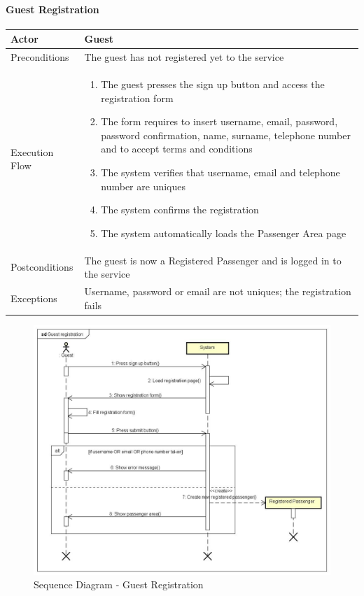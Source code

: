 		\paragraph{Guest Registration}
			\begin{center}
				\begin{tabular}{ | l | p{8cm} |}
					\hline
					Actor &  Guest	\\ \hline
					Preconditions & The guest has not registered yet to the service		\\ \hline
					Execution Flow & \begin{enumerate}
						\item The guest presses the sign up button and access the registration form
						\item The form requires to insert username, email, password, password confirmation, name, surname, telephone number and to accept terms and conditions
						\item The system verifies that username, email and telephone number are uniques
						\item The system confirms the registration
						\item The system automatically loads the Passenger Area page
					\end{enumerate}		\\ \hline
					Postconditions & The guest is now a Registered Passenger and is logged in to the service	\\ \hline
					Exceptions & Username, password or email are not uniques; the registration fails \\ \hline
				\end{tabular}
			\end{center}
			\begin{figure}[!h]
				\begin{center}			
					\includegraphics[scale=0.45]{../SE2_SD/GuestRegistration}
					\caption{Sequence Diagram - Guest Registration}	
				\end{center}
			\end{figure}
